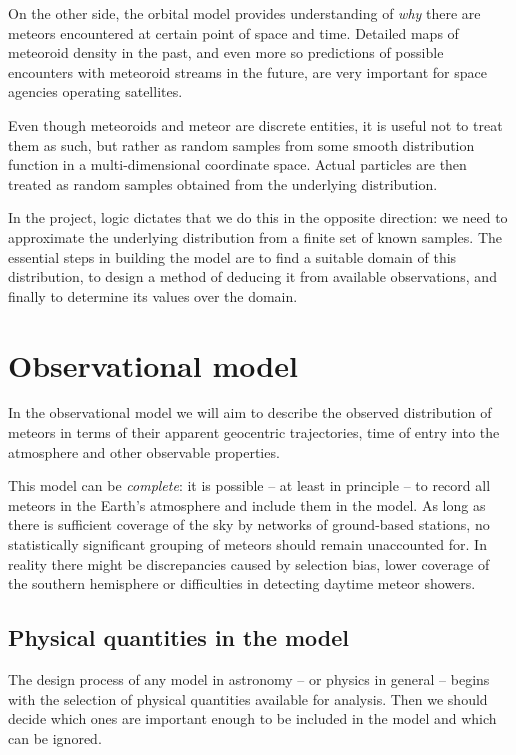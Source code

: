 On the other side, the orbital model provides understanding of \emph{why} there are meteors
encountered at certain point of space and time. Detailed maps of meteoroid density in the past,
and even more so predictions of possible encounters with meteoroid streams in the future,
are very important for space agencies operating satellites.

Even though meteoroids and meteor are discrete entities, it is useful not to treat them as such,
but rather as random samples from some smooth distribution function in a multi-dimensional coordinate space.
Actual particles are then treated as random samples obtained from the underlying distribution.

In the project, logic dictates that we do this in the opposite direction: we need to approximate
the underlying distribution from a finite set of known samples.
The essential steps in building the model are to find a suitable domain of this distribution,
to design a method of deducing it from available observations, and finally to
determine its values over the domain.


\section{Observational model} \label{ms}
    In the observational model we will aim to describe the observed distribution of meteors
    in terms of their apparent geocentric trajectories, time of entry into the atmosphere and other
    observable properties.

    This model can be \emph{complete}: it is possible -- at least in principle -- to record all
    meteors in the Earth's atmosphere and include them in the model.
    As long as there is sufficient coverage of the sky by networks of ground-based stations,
    no statistically significant grouping of meteors should remain unaccounted for.
    In reality there might be discrepancies caused by selection bias,
    lower coverage of the southern hemisphere or difficulties in detecting daytime meteor showers.

    \subsection{Physical quantities in the model} \label{msp}
        The design process of any model in astronomy -- or physics in general -- begins with the selection
        of physical quantities available for analysis. Then we should decide which ones are important enough
        to be included in the model and which can be ignored.

